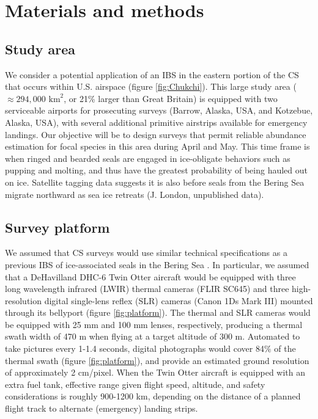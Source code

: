 \documentclass[]{rsos}%
\begin{document}
\section{Materials and methods}

\subsection{Study area}

We consider a potential application of an IBS in the eastern portion of the CS that occurs within U.S. airspace (figure \ref{fig:Chukchi}).  This large study area ($\approx 294,000$ $\text{km}^2$, or 21\% larger than Great Britain) is equipped with two serviceable airports for prosecuting surveys (Barrow, Alaska, USA, and Kotzebue, Alaska, USA), with several additional primitive airstrips available for emergency landings.  Our objective will be to design surveys that permit reliable abundance estimation for focal species in this area during April and May.  This time frame is when ringed and bearded seals are engaged in ice-obligate behaviors such as pupping and molting, and thus have the greatest probability of being hauled out on ice. Satellite tagging data suggests it is also before seals from the Bering Sea migrate northward as sea ice retreats (J. London, unpublished data).

\subsection{Survey platform}

We assumed that CS surveys would use similar technical specifications as a previous IBS of ice-associated seals in the Bering Sea \cite{ConnEtAl2014}.  In particular, we assumed that a DeHavilland DHC-6 Twin Otter aircraft would be equipped with three long wavelength infrared (LWIR) thermal cameras (FLIR SC645) and three high-resolution digital single-lens reflex (SLR) cameras  (Canon 1Ds Mark III) mounted through its bellyport (figure \ref{fig:platform}). The thermal and SLR cameras would be equipped with 25 mm and 100 mm lenses, respectively, producing a thermal swath width of 470 m when flying at a target altitude of 300 m. Automated to take pictures every 1-1.4 seconds, digital photographs would cover 84$\%$ of the thermal swath (figure \ref{fig:platform}), and provide an estimated ground resolution of approximately 2 cm/pixel.  When the Twin Otter aircraft is equipped with an extra fuel tank, effective range given flight speed, altitude, and safety considerations is roughly 900-1200 km, depending on the distance of a planned flight track to alternate (emergency) landing strips.
\end{document}
